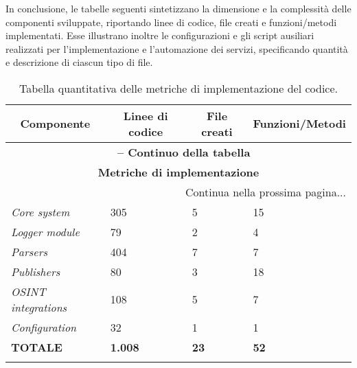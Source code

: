 In conclusione, le tabelle seguenti sintetizzano la dimensione e la complessità delle componenti sviluppate, riportando linee di codice, file creati e funzioni/metodi implementati. Esse illustrano inoltre le configurazioni e gli script ausiliari realizzati per l'implementazione e l'automazione dei servizi, specificando quantità e descrizione di ciascun tipo di file.
\begin{center}
\begin{longtable}{|p{}|p{}|p{}|p{}|}
\hline
\multicolumn{1}{|c|}{\textbf{Componente}} & 
\multicolumn{1}{c|}{\textbf{Linee di codice}} & 
\multicolumn{1}{c|}{\textbf{File creati}} & 
\multicolumn{1}{c|}{\textbf{Funzioni/Metodi}} \\ 
\hline
\endfirsthead

\multicolumn{4}{c}{{\bfseries \tablename\ \thetable{} -- Continuo della tabella}}\\
\hline
\multicolumn{4}{|c|}{\textbf{Metriche di implementazione}} \\ \hline
\endhead

\hline \multicolumn{4}{|r|}{{Continua nella prossima pagina...}} \\ \hline
\endfoot

\endlastfoot

\textit{Core system} & 305 & 5 & 15 \\ \hline
\textit{Logger module} & 79 & 2 & 4 \\ \hline
\textit{Parsers} & 404 & 7 & 7 \\ \hline
\textit{Publishers} & 80 & 3 & 18 \\ \hline
\textit{OSINT integrations} & 108 & 5 & 7 \\ \hline
\textit{Configuration} & 32 & 1 & 1 \\ \hline
\textbf{TOTALE} & \textbf{1.008} & \textbf{23} & \textbf{52} \\ \hline

\caption{Tabella quantitativa delle metriche di implementazione del codice.}
\label{tab:metriche-codice}
\end{longtable}
\end{center}

